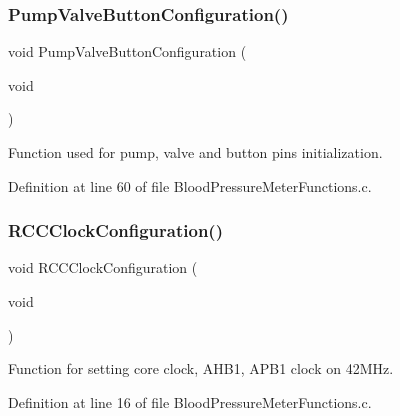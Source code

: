 \subsubsection{\texorpdfstring{PumpValveButtonConfiguration()}{PumpValveButtonConfiguration()}}
{\footnotesize\ttfamily void Pump\+Valve\+Button\+Configuration (\begin{DoxyParamCaption}\item[{void}]{ }\end{DoxyParamCaption})}



Function used for pump, valve and button pins initialization. 



Definition at line 60 of file Blood\+Pressure\+Meter\+Functions.\+c.

\mbox{\label{group___blood_pressure_meter_functions_ga3a2706feaeba456e1fc2bb14be91fd22_ga3a2706feaeba456e1fc2bb14be91fd22}} 
\subsubsection{\texorpdfstring{RCCClockConfiguration()}{RCCClockConfiguration()}}
{\footnotesize\ttfamily void R\+C\+C\+Clock\+Configuration (\begin{DoxyParamCaption}\item[{void}]{ }\end{DoxyParamCaption})}



Function for setting core clock, A\+H\+B1, A\+P\+B1 clock on 42M\+Hz. 



Definition at line 16 of file Blood\+Pressure\+Meter\+Functions.\+c.

\mbox{\label{group___blood_pressure_meter_functions_gab108244597f329a2bc329694c6fa08e4_gab108244597f329a2bc329694c6fa08e4}} 
